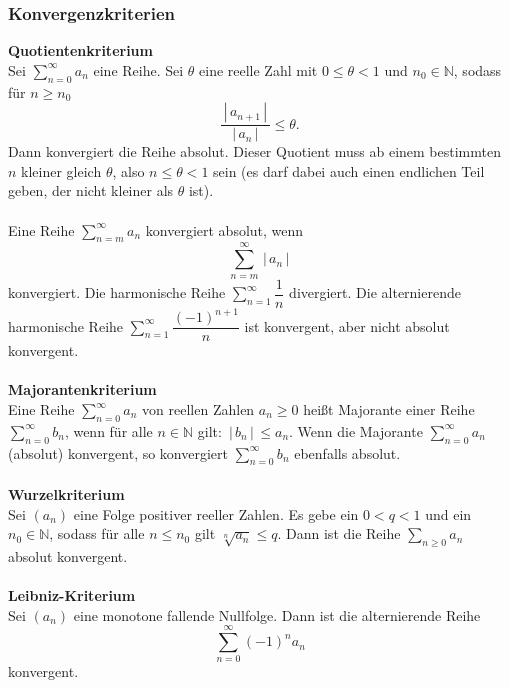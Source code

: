 \documentclass[a4paper,12pt]{article}
\begin{document}
\subsubsection{Konvergenzkriterien}
\textbf{Quotientenkriterium}\\ 
Sei $\sum_{n=0}^{\infty}a_n$ eine Reihe. Sei $\theta $ eine reelle Zahl mit $0\leq \theta <1$ und $n_0 \in \mathbb{N}$, sodass für $n\geq n_0$ 
\[ 
        \dfrac{\,|\, a_{n+1}\,|\, }{\,|\, a_n\,|\, }\leq \theta 
.\] 
Dann konvergiert die Reihe absolut. Dieser Quotient muss ab einem bestimmten $n$ kleiner gleich $\theta $, also $n\leq \theta <1$ sein (es darf dabei auch einen endlichen Teil geben, der nicht kleiner als $\theta $ ist).\\\\
Eine Reihe $\sum_{n=m}^{\infty}a_n$ konvergiert absolut, wenn
\[ 
        \sum_{n=m}^{\infty}\,|\, a_n\,|\, 
\] 
konvergiert. Die harmonische Reihe $\sum_{n=1}^{\infty}\dfrac{1}{n}$ divergiert. Die alternierende harmonische Reihe $\sum_{n=1}^{\infty}\dfrac{\left(-1\right)^{n+1}}{n}$ ist konvergent, aber nicht absolut konvergent.
\\\hfill\\\textbf{Majorantenkriterium}\\ 
Eine Reihe $\sum_{n=0}^{\infty}a_n$ von reellen Zahlen $a_n\geq 0$ heißt Majorante einer Reihe $\sum_{n=0}^{\infty}b_n$, wenn für alle $n  \in \mathbb{N}$ gilt: $\,|\, b_n\,|\, \leq a_n$. Wenn die Majorante $\sum_{n=0}^{\infty}a_n$ (absolut) konvergent, so konvergiert $\sum_{n=0}^{\infty}b_n$ ebenfalls absolut.
\\\hfill\\\textbf{Wurzelkriterium}\\ 
Sei $\left(a_n\right)$ eine Folge positiver reeller Zahlen. Es gebe ein $0<q<1$ und ein $n_0  \in \mathbb{N}$, sodass für alle $n\leq n_0$ gilt $\sqrt[n]{a_n}\leq q$. Dann ist die Reihe $\sum_{n\geq 0}^{}a_n$ absolut konvergent.
\\\hfill\\\textbf{Leibniz-Kriterium}\\ 
Sei $\left(a_n\right)$ eine monotone fallende Nullfolge. Dann ist die alternierende Reihe
\[ 
        \sum_{n=0}^{\infty}\left(-1\right)^{n}a_n
\] 
konvergent.
\end{document}
